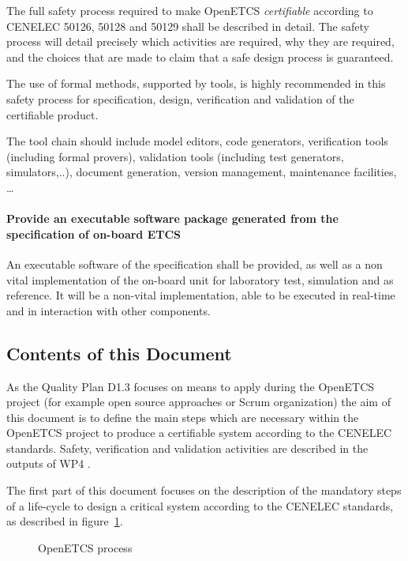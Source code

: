 The full safety process required to make OpenETCS \emph{certifiable} according to CENELEC 50126, 50128 and 50129 shall be described in detail. The safety process will detail precisely which activities are required, why they are required, and the choices that are made to claim that a safe design process is guaranteed.

The use of formal methods, supported by tools, is highly recommended in this safety process for specification, design, verification and validation of the certifiable product.

The tool chain should include model editors, code generators, verification tools (including formal provers), validation tools (including test generators, simulators,..), document generation, version management, maintenance facilities, \dots

\paragraph{Provide an executable software package generated from the specification of on-board ETCS}

An executable software of the specification shall be provided, as well as a non vital implementation of the on-board unit for laboratory test, simulation and as reference. It will be a non-vital  implementation, able to be executed in real-time and in interaction with other components.


\subsection{Contents of this Document}

As the Quality Plan D1.3 \cite{QP} focuses on means to apply during the OpenETCS project (for example open source approaches or Scrum organization) the aim of this document is to define the main steps which are necessary within the OpenETCS project to produce a certifiable system according to the CENELEC standards.
Safety, verification and validation activities are described in the outputs of WP4 \cite{D4_1, D4_5a}.

The first part of this document focuses on the description of the mandatory steps of a life-cycle to design a critical system according to the CENELEC standards, as described in figure~\ref{fig:OETCSProcess}.

\begin{figure}[h]
  \centering
  \caption{OpenETCS process}
  \label{fig:OETCSProcess}
\end{figure}


